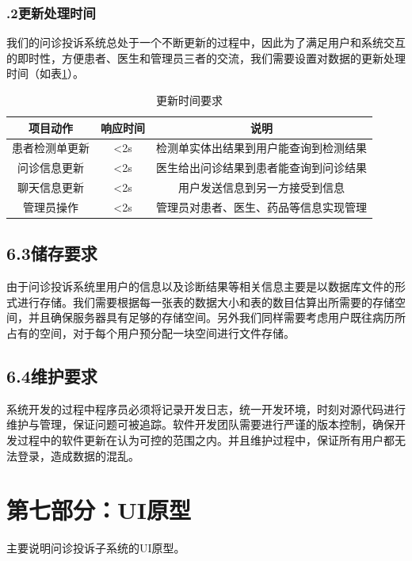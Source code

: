 \documentclass[24pt,a4paper]{article}%
\begin{document}
\subsubsection*{.2更新处理时间}

我们的问诊投诉系统总处于一个不断更新的过程中，因此为了满足用户和系统交互的即时性，方便患者、医生和管理员三者的交流，我们需要设置对数据的更新处理时间（如表\ref*{refresh-time}）。
\begin{table}[htpb]
	\centering
	\caption{更新时间要求}
	\label{refresh-time}
	\begin{tabular}{|c|c|c|}
		\hline
		项目动作 & 响应时间 & 说明\\ \hline
		患者检测单更新 & <2s & 检测单实体出结果到用户能查询到检测结果\\ \hline
		问诊信息更新 & <2s & 医生给出问诊结果到患者能查询到问诊结果\\ \hline
		聊天信息更新 & <2s & 用户发送信息到另一方接受到信息\\ \hline
		管理员操作 & <2s & 管理员对患者、医生、药品等信息实现管理\\ \hline
	\end{tabular}
\end{table}

\subsection*{\songti 6.3储存要求}

由于问诊投诉系统里用户的信息以及诊断结果等相关信息主要是以数据库文件的形式进行存储。我们需要根据每一张表的数据大小和表的数目估算出所需要的存储空间，并且确保服务器具有足够的存储空间。另外我们同样需要考虑用户既往病历所占有的空间，对于每个用户预分配一块空间进行文件存储。

\subsection*{\songti 6.4维护要求}

系统开发的过程中程序员必须将记录开发日志，统一开发环境，时刻对源代码进行维护与管理，保证问题可被追踪。软件开发团队需要进行严谨的版本控制，确保开发过程中的软件更新在认为可控的范围之内。并且维护过程中，保证所有用户都无法登录，造成数据的混乱。

\section*{\songti 第七部分：UI原型}
主要说明问诊投诉子系统的UI原型。
\end{document}
